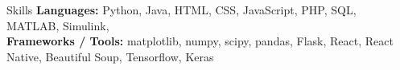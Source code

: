 \documentclass{resume}
\begin{document}
    \begin{rSection}{Skills}
        \textbf{Languages:} Python, Java, HTML, CSS, JavaScript, PHP, SQL, MATLAB, Simulink, \\
        \textbf{Frameworks / Tools:} matplotlib, numpy, scipy, pandas, Flask, React, React Native, Beautiful Soup, Tensorflow, Keras \\ 
    \end{rSection}
    \begin{comment}

    
    \begin{rSection}{Skills}
        \textbf{Languages}  \\
        Python, Java, HTML, CSS, JavaScript, PHP, SQL, MATLAB, Simulink \\
        \textbf{Libraries / Frameworks}  \\
        matplotlib, numpy, pandas, Flask, React, React Native, Beautiful Soup \\
        \textbf{Others} \\
        Git, \LaTeX, REST
    \end{rSection}

    \begin{rSection}{Courses}

        {CS50's Introduction to Artificial Intelligence with Python} \hfill {\em Harvard University - May 2020}

        {Analysing Data with Python} \hfill {\em IBM - April 2020}

        {DAT275X: Principles of Machine Learning: Python Edition} \hfill {\em Microsoft - June 2019}

        {DAT236X: Deep Learning Explained.} \hfill {\em Microsoft - July 2019}

        {Front-end Web Development with React} \hfill {\em HKUST - June 2020}

    \end{rSection}

   



    \end{comment}        

        
   
       
\end{document}
